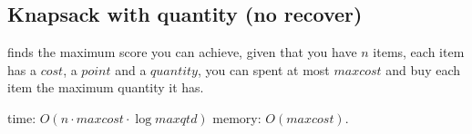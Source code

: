\subsection{Knapsack with quantity (no recover)}

finds the maximum score you can achieve, given that you have $n$ items, each item has a $cost$, a $point$ and a $quantity$, you can spent at most $maxcost$ and buy each item the maximum quantity it has.

time: $O(n \cdot maxcost \cdot \log{maxqtd})$
memory: $O(maxcost)$.
